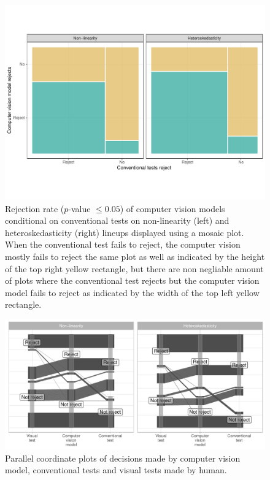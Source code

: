 \documentclass[]{interact}
\theoremstyle{plain}%
\theoremstyle{definition}
\theoremstyle{remark}
\begin{document}
\begin{figure}[!h]

{\centering \includegraphics[width=1\linewidth]{paper_files/figure-latex/conv-mosaic-1} 

}

\caption{Rejection rate ($p$-value $\leq0.05$) of computer vision models conditional on conventional tests on non-linearity (left) and heteroskedasticity (right) lineups displayed using a mosaic plot. When the conventional test fails to reject, the computer vision mostly fails to reject the same plot as well as indicated by the height of the top right yellow rectangle, but there are non negliable amount of plots where the conventional test rejects but the computer vision model fails to reject as indicated by the width of the top left yellow rectangle.}\label{fig:conv-mosaic}
\end{figure}

\begin{figure}[!h]

{\centering \includegraphics[width=1\linewidth]{paper_files/figure-latex/pcp-1} 

}

\caption{Parallel coordinate plots of decisions made by computer vision model, conventional tests and visual tests made by human.}\label{fig:pcp}
\end{figure}
\end{document}
